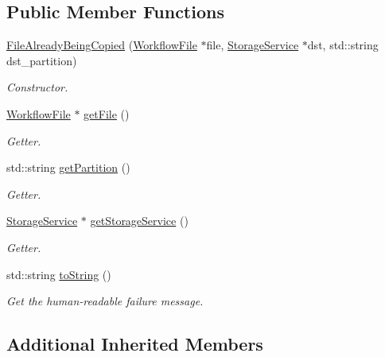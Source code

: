\subsection*{Public Member Functions}
\begin{DoxyCompactItemize}
\item 
\hyperlink{classwrench_1_1_file_already_being_copied_ae64320ee14267cee48463eca2f902a0f}{File\+Already\+Being\+Copied} (\hyperlink{classwrench_1_1_workflow_file}{Workflow\+File} $\ast$file, \hyperlink{classwrench_1_1_storage_service}{Storage\+Service} $\ast$dst, std\+::string dst\+\_\+partition)
\begin{DoxyCompactList}\small\item\em Constructor. \end{DoxyCompactList}\item 
\hyperlink{classwrench_1_1_workflow_file}{Workflow\+File} $\ast$ \hyperlink{classwrench_1_1_file_already_being_copied_a4bb8bd28c57ad1c9a37985b45f5005f4}{get\+File} ()
\begin{DoxyCompactList}\small\item\em Getter. \end{DoxyCompactList}\item 
std\+::string \hyperlink{classwrench_1_1_file_already_being_copied_af1e681d40a77ced81ce05fa49f1fabf5}{get\+Partition} ()
\begin{DoxyCompactList}\small\item\em Getter. \end{DoxyCompactList}\item 
\hyperlink{classwrench_1_1_storage_service}{Storage\+Service} $\ast$ \hyperlink{classwrench_1_1_file_already_being_copied_afac6f9f7f7dae1f51487c5a6223cad30}{get\+Storage\+Service} ()
\begin{DoxyCompactList}\small\item\em Getter. \end{DoxyCompactList}\item 
std\+::string \hyperlink{classwrench_1_1_file_already_being_copied_a44fa6078be3bd9e0b06cd536b691666c}{to\+String} ()
\begin{DoxyCompactList}\small\item\em Get the human-\/readable failure message. \end{DoxyCompactList}\end{DoxyCompactItemize}
\subsection*{Additional Inherited Members}


